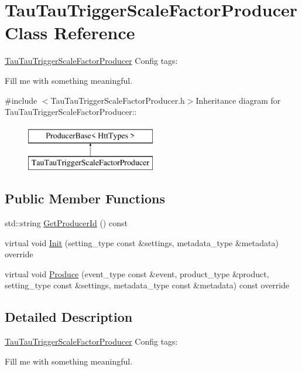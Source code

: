 \hypertarget{classTauTauTriggerScaleFactorProducer}{
\section{TauTauTriggerScaleFactorProducer Class Reference}
\label{classTauTauTriggerScaleFactorProducer}
}


\hyperlink{classTauTauTriggerScaleFactorProducer}{TauTauTriggerScaleFactorProducer} Config tags:
\begin{DoxyItemize}
\item Fill me with something meaningful. 
\end{DoxyItemize} 


{\ttfamily \#include $<$TauTauTriggerScaleFactorProducer.h$>$}Inheritance diagram for TauTauTriggerScaleFactorProducer::\begin{figure}[H]
\begin{center}
\leavevmode
\includegraphics[height=2cm]{classTauTauTriggerScaleFactorProducer}
\end{center}
\end{figure}
\subsection*{Public Member Functions}
\begin{DoxyCompactItemize}
\item 
std::string \hyperlink{classTauTauTriggerScaleFactorProducer_a8a91047ac7da1cbb48177e212617d361}{GetProducerId} () const 
\item 
virtual void \hyperlink{classTauTauTriggerScaleFactorProducer_a902203f3270c214095376e5d0df162d0}{Init} (setting\_\-type const \&settings, metadata\_\-type \&metadata) override
\item 
virtual void \hyperlink{classTauTauTriggerScaleFactorProducer_a17a3e0477edd35f3d4aef2ca763efe94}{Produce} (event\_\-type const \&event, product\_\-type \&product, setting\_\-type const \&settings, metadata\_\-type const \&metadata) const override
\end{DoxyCompactItemize}


\subsection{Detailed Description}
\hyperlink{classTauTauTriggerScaleFactorProducer}{TauTauTriggerScaleFactorProducer} Config tags:
\begin{DoxyItemize}
\item Fill me with something meaningful. 
\end{DoxyItemize}

